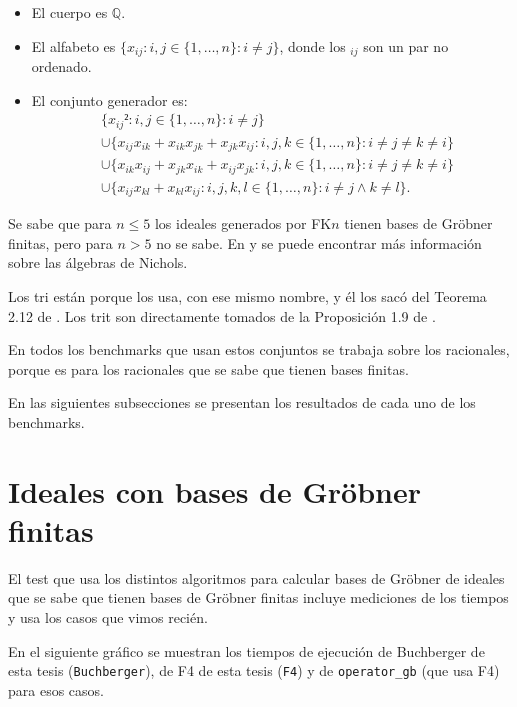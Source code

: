 \documentclass[12pt]{report}
\theoremstyle{customstyle}
\theoremstyle{factstyle}
\begin{document}
\begin{itemize}
  \item El cuerpo es $ℚ$.
  \item El alfabeto es $\{x_{ij} : i, j ∈ \{1, …, n\} : i ≠ j\}$, donde los $_{ij}$ son un par no ordenado.
  \item El conjunto generador es:
  \begin{align*}
    & \{ x_{ij}² : i, j ∈ \{1, …, n\} : i ≠ j \} \\
    & ∪ \{ x_{ij} x_{ik} + x_{ik} x_{jk} + x_{jk} x_{ij} : i, j, k ∈ \{1, …, n\} : i ≠ j ≠ k ≠ i \} \\
    & ∪ \{ x_{ik} x_{ij} + x_{jk} x_{ik} + x_{ij} x_{jk} : i, j, k ∈ \{1, …, n\} : i ≠ j ≠ k ≠ i \} \\
    & ∪ \{ x_{ij} x_{kl} + x_{kl} x_{ij} : i, j, k, l ∈ \{1, …, n\} : i ≠ j ∧ k ≠ l \} \text{.}
  \end{align*}
\end{itemize}

\noindent Se sabe que para $n ≤ 5$ los ideales generados por FK$n$ tienen bases de Gröbner finitas, pero para $n > 5$ no se sabe. En \cite{web:Nichols} y \cite{book:introNichols} se puede encontrar más información sobre las álgebras de Nichols.

Los tri están porque \cite{thesis:Hof20} los usa, con ese mismo nombre, y él los sacó del Teorema 2.12 de \cite{book:class-tri}. Los trit son directamente tomados de la Proposición 1.9 de \cite{book:class-tri}.

En todos los benchmarks que usan estos conjuntos se trabaja sobre los racionales, porque es para los racionales que se sabe que tienen bases finitas.

En las siguientes subsecciones se presentan los resultados de cada uno de los benchmarks.

\section{Ideales con bases de Gröbner finitas}\label{section:Ideales con bases de Gröbner finitas}

El test que usa los distintos algoritmos para calcular bases de Gröbner de ideales que se sabe que tienen bases de Gröbner finitas incluye mediciones de los tiempos y usa los casos que vimos recién.

En el siguiente gráfico se muestran los tiempos de ejecución de Buchberger de esta tesis (\texttt{Buchberger}), de F4 de esta tesis (\texttt{F4}) y de \texttt{operator\_gb} (que usa F4) para esos casos.
\end{document}
